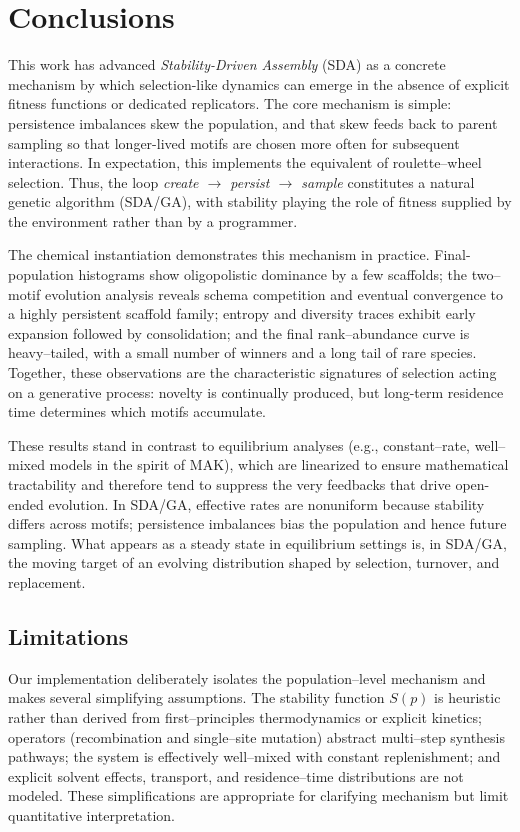 \documentclass[life,article,submit,pdftex,moreauthors]{Definitions/mdpi}
\begin{document}
\section{Conclusions}

This work has advanced \textit{Stability-Driven Assembly} (SDA) as a concrete mechanism by which selection-like dynamics can emerge in the absence of explicit fitness functions or dedicated replicators. The core mechanism is simple: persistence imbalances skew the population, and that skew feeds back to parent sampling so that longer-lived motifs are chosen more often for subsequent interactions. In expectation, this implements the equivalent of roulette–wheel selection. Thus, the loop \emph{create $\rightarrow$ persist $\rightarrow$ sample} constitutes a natural genetic algorithm (SDA/GA), with stability playing the role of fitness supplied by the environment rather than by a programmer.

The chemical instantiation demonstrates this mechanism in practice. Final-population histograms show oligopolistic dominance by a few scaffolds; the two–motif evolution analysis reveals schema competition and eventual convergence to a highly persistent scaffold family; entropy and diversity traces exhibit early expansion followed by consolidation; and the final rank–abundance curve is heavy–tailed, with a small number of winners and a long tail of rare species. Together, these observations are the characteristic signatures of selection acting on a generative process: novelty is continually produced, but long-term residence time determines which motifs accumulate.

These results stand in contrast to equilibrium analyses (e.g., constant–rate, well–mixed models in the spirit of MAK), which are linearized to ensure mathematical tractability and therefore tend to suppress the very feedbacks that drive open-ended evolution. In SDA/GA, effective rates are nonuniform because stability differs across motifs; persistence imbalances bias the population and hence future sampling. What appears as a steady state in equilibrium settings is, in SDA/GA, the moving target of an evolving distribution shaped by selection, turnover, and replacement.

\subsection{Limitations}
Our implementation deliberately isolates the population–level mechanism and makes several simplifying assumptions. The stability function $S(p)$ is heuristic rather than derived from first–principles thermodynamics or explicit kinetics; operators (recombination and single–site mutation) abstract multi–step synthesis pathways; the system is effectively well–mixed with constant replenishment; and explicit solvent effects, transport, and residence–time distributions are not modeled. These simplifications are appropriate for clarifying mechanism but limit quantitative interpretation.
\end{document}
